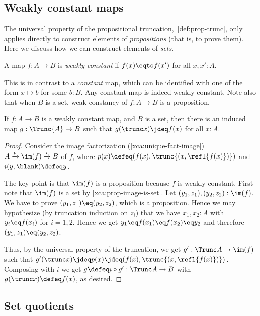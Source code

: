 \subsection{Weakly constant maps}

The universal property of the propositional truncation,~\cref{def:prop-trunc},
only applies directly to construct elements of \emph{propositions} (that is, to prove them).
Here we discuss how we can construct elements of \emph{sets}.

\begin{definition}
  A map $f: A \to B$ is \emph{weakly constant} if $f(x) \eqto f(x')$ for all $x,x':A$.
\end{definition}
This is in contrast to a \emph{constant} map,
which can be identified with one of the form $x \mapsto b$ for some $b:B$.
Any constant map is indeed weakly constant.
Note also that when $B$ is a set,
weak constancy of $f : A \to B$ is a proposition.

\begin{theorem}\label{thm:wconstant-elim}
  If $f : A \to B$ is a weakly constant map, and $B$ is a set, then
  there is an induced map $g : \Trunc{A} \to B$ such that
  $g(\trunc x)\jdeq f(x)$ for all $x:A$.
\end{theorem}
\begin{proof}
  Consider the image factorization (\cref{xca:unique-fact-image})
  $A \xrightarrow{p}{} \im(f) \xrightarrow{i}{} B$ of $f$,
  where $p(x) \defeq (f(x),\trunc{(x,\refl{f(x)})})$
  and $i(y,\blank) \defeq y$.

  The key point is that $\im(f)$ is a proposition because
  $f$ is weakly constant. First note that $\im(f)$ is a set
  by \cref{xca:prop-image-is-set}.
  Let $(y_1,z_1),(y_2,z_2):\im(f)$. We have to prove
  $(y_1,z_1) \eq (y_2,z_2)$, which is a proposition.
  Hence we may hypothesize (by truncation induction on $z_i$)
  that we have $x_1,x_2:A$ with $y_i \eq f(x_i)$ for $i=1,2$.
  Hence we get $y_1 \eq f(x_1) \eq f(x_2) \eq y_2$ and
  therefore $(y_1,z_1) \eq (y_2,z_2)$.

  Thus, by the universal property of the truncation,
  we get $g' : \Trunc A \to \im(f)$ such
  that $g'(\trunc x) \jdeq p(x) \jdeq (f(x),\trunc{(x,\refl{f(x)})})$.
  Composing with $i$ we get $g\defeq i\circ g' : \Trunc A \to B$
  with $g(\trunc x) \defeq f(x)$, as desired.
\end{proof}

\subsection{Set quotients}

